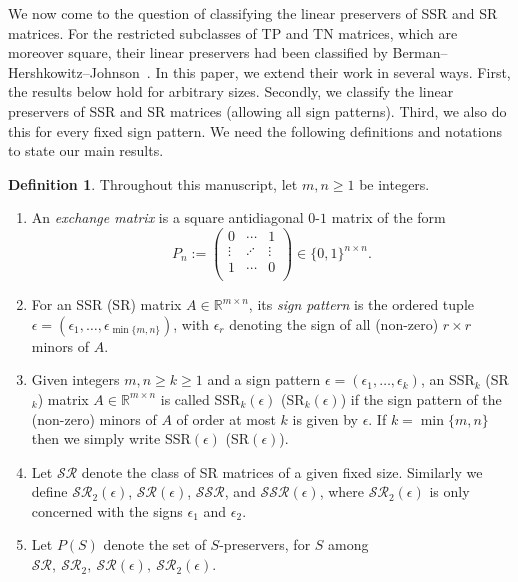 \documentclass[11pt,reqno]{amsart}
\theoremstyle{plain}
\theoremstyle{definition}
\newtheorem{defn}[theorem]{Definition}
\numberwithin{equation}{section}
\begin{document}
We now come to the question of classifying the linear preservers of SSR and SR matrices. For the restricted  subclasses of TP and TN matrices, which are moreover square, their  linear preservers had been classified by Berman--Hershkowitz--Johnson~\cite{BHJ85}. In this paper, we extend their work in several ways. First, the results below hold for arbitrary sizes. Secondly, we classify the linear preservers of SSR and SR matrices (allowing all sign patterns). Third, we also do this for every fixed sign pattern. We need the following definitions and notations to state our main results.

\begin{defn} Throughout this manuscript, let $m,n\geq1$ be integers.
	\begin{enumerate}
		\item An \textit{exchange matrix} is a square antidiagonal $0$-$1$ matrix of the form
		\[P_n:=\begin{pmatrix}
			0 & \cdots & 1 \\
			\vdots & \iddots & \vdots \\
			1 & \cdots & 0 \\
		\end{pmatrix} \in \{ 0, 1 \}^{n\times n}.\]
		
		\item For an SSR (SR) matrix $A \in \mathbb{R}^{m\times n}$, its \textit{sign pattern} is the
		ordered tuple $\epsilon = (\epsilon_1, \dots, \epsilon_{\min\{m,n\}})$, with $\epsilon_r$ denoting the sign of all (non-zero) $r \times r$ minors of $A$. %
		
		\item Given integers $m,n\geq k\geq 1$ and a sign pattern $\epsilon=(\epsilon_1,\ldots,\epsilon_k)$, an SSR$_k$ (SR$_k$) matrix $A\in \mathbb{R}^{m\times n}$ is called SSR$_k({\epsilon})$ (SR$_k({\epsilon})$) if the sign pattern of the (non-zero) minors of $A$ of order at most $k$ is given by $\epsilon$. If $k=\min\{m,n\}$ then we simply write SSR$(\epsilon)$ (SR$(\epsilon)$).
		
		\item Let $\mathcal{SR}$ denote the class of SR matrices of a given fixed size. Similarly we define $\mathcal{SR}_2(\epsilon)$, $\mathcal{SR}(\epsilon)$, $\mathcal{SSR}$, and $\mathcal{SSR}(\epsilon)$, where $\mathcal{SR}_2(\epsilon)$ is only concerned with  the signs $\epsilon_1$ and $\epsilon_2$.
		
		\item Let $P(S)$ denote the set of $S$-preservers, for $S$ among $\mathcal{SR},\ \mathcal{SR}_2,\ \mathcal{SR}(\epsilon),\ \mathcal{SR}_2(\epsilon)$.
	\end{enumerate} 
\end{defn}
\end{document}
